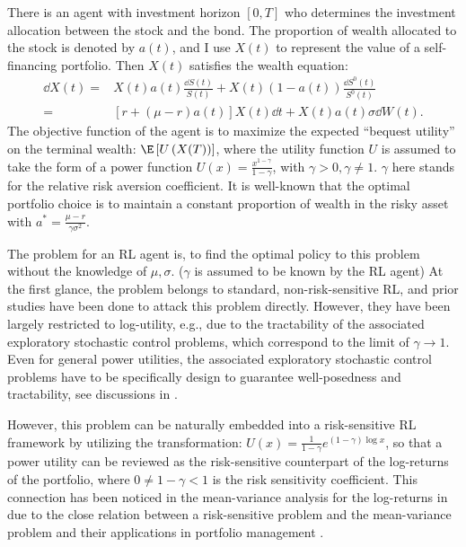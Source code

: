 There is an agent with investment horizon $[0,T]$ who determines the investment allocation between the stock and the bond. The proportion of wealth allocated to the stock is denoted by $a(t)$, and I use $X(t)$ to represent the value of a self-financing portfolio. Then $X(t)$ satisfies the wealth equation:
\begin{equation}
	\label{eq:state dynamics X}
	\begin{aligned}
		\dd X(t) = & X(t) a(t)\frac{\dd S(t)}{S(t)} + X(t)(1 - a(t)) \frac{\dd S^0(t)}{S^0(t)}\\
		= & [r + (\mu - r)a(t)] X(t)  \dd t + X(t) a(t)\sigma \dd W(t) .    
	\end{aligned}
\end{equation}
The objective function of the agent is to maximize the expected ``bequest utility'' on the terminal wealth: $\E\left[ U\left( X(T) \right)\right]$, where the utility function $U$ is assumed to take the form of a power function $U(x) = \frac{x^{1-\gamma}}{1-\gamma}$, with $\gamma > 0,\gamma \neq 1$. $\gamma$ here stands for the relative risk aversion coefficient. It is well-known that the optimal portfolio choice is to maintain a constant proportion of wealth in the risky asset with $a^* = \frac{\mu-r}{\gamma \sigma^2}$.

The problem for an RL agent is, to find the optimal policy to this problem without the knowledge of $\mu,\sigma$. ($\gamma$ is assumed to be known by the RL agent) At the first glance, the problem belongs to standard, non-risk-sensitive RL, and prior studies have been done to attack this problem directly. However, they have been largely restricted to log-utility, e.g., \cite{dai2023learning,jiang2022reinforcement} due to the tractability of the associated exploratory stochastic control problems, which correspond to the limit of $\gamma \to 1$. Even for general power utilities, the associated exploratory stochastic control problems have to be specifically design to guarantee well-posedness and tractability, see discussions in \cite{dai2023recursive}.

However, this problem can be naturally embedded into a risk-sensitive RL framework by utilizing the transformation: $U(x) = \frac{1}{1-\gamma}e^{(1-\gamma)\log x}$, so that a power utility can be reviewed as the risk-sensitive counterpart of the log-returns of the portfolio, where $0\neq 1-\gamma < 1$ is the risk sensitivity coefficient. This connection has been noticed in the mean-variance analysis for the log-returns in \citet{dai2021dynamic} due to the close relation between a risk-sensitive problem and the mean-variance problem and their applications in portfolio management \citep{bielecki1999risk}.

